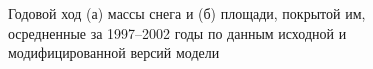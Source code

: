 \documentclass[a4paper, fontsize=14pt]{scrartcl}
\begin{document}
\begin{figure}[h]
    \begin{minipage}[h]{0.48\linewidth}
    \end{minipage}
    \hfill
    \begin{minipage}[h]{0.51\linewidth}
    \end{minipage}
    \caption{Годовой ход (а) массы снега и (б) площади, покрытой им, осредненные за 1997--2002 годы по данным исходной и модифицированной версий модели}
    \label{fig:imageSn}
\end{figure}
\end{document}
